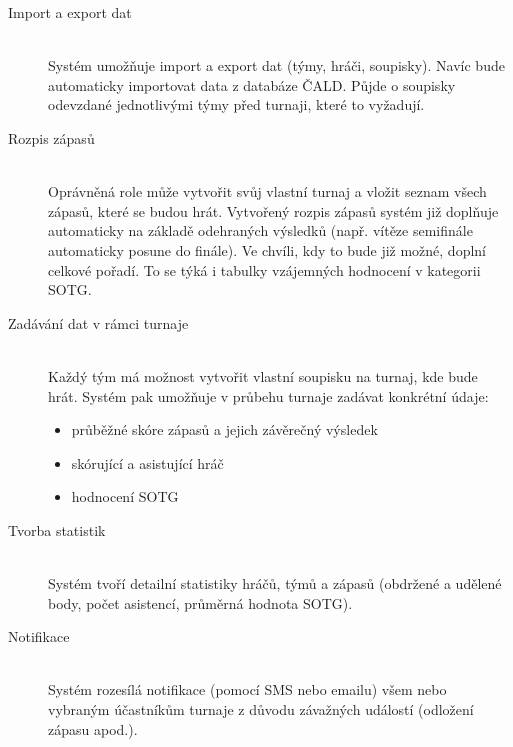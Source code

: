 \documentclass[thesis=B,czech]{FITthesis}[2012/06/26]
\begin{document}
\begin{description}
  \item[Import a export dat] \hfill \\
  Systém umožňuje import a export dat (týmy, hráči, soupisky). Navíc bude automaticky
  importovat data z databáze ČALD. Půjde o soupisky odevzdané jednotlivými týmy
  před turnaji, které to vyžadují.

  \item[Rozpis zápasů] \hfill \\
  Oprávněná role může vytvořit svůj vlastní turnaj a vložit seznam všech zápasů,
  které se budou hrát. Vytvořený rozpis zápasů systém již doplňuje automaticky na základě
  odehraných výsledků (např. vítěze semifinále automaticky posune do finále). Ve chvíli,
  kdy to bude již možné, doplní celkové pořadí. To se týká i tabulky vzájemných hodnocení
  v kategorii SOTG.

  \item[Zadávání dat v rámci turnaje] \hfill \\
  Každý tým má možnost vytvořit vlastní soupisku na turnaj, kde bude hrát. Systém pak umožňuje
  v průbehu turnaje zadávat konkrétní údaje:
  \begin{itemize}
    \item průběžné skóre zápasů a jejich závěrečný výsledek
    \item skórující a asistující hráč
    \item hodnocení SOTG
  \end{itemize}
  
  \item[Tvorba statistik] \hfill \\
  Systém tvoří detailní statistiky hráčů, týmů a zápasů (obdržené a udělené body,
  počet asistencí, průměrná hodnota SOTG).
  
  \item[Notifikace] \hfill \\
  Systém rozesílá notifikace (pomocí SMS nebo emailu) všem nebo vybraným účastníkům
  turnaje z důvodu závažných událostí (odložení zápasu apod.).
\end{description}

\end{document}
